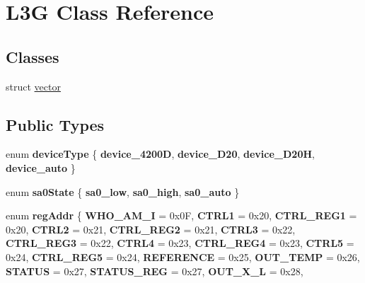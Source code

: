 \hypertarget{class_l3_g}{}\section{L3G Class Reference}
\label{class_l3_g}
\subsection*{Classes}
\begin{DoxyCompactItemize}
\item 
struct \hyperlink{struct_l3_g_1_1vector}{vector}
\end{DoxyCompactItemize}
\subsection*{Public Types}
\begin{DoxyCompactItemize}
\item 
\mbox{\label{class_l3_g_a1bdc3c228ca5694828d9c174d52d9699}} 
enum {\bfseries device\+Type} \{ {\bfseries device\+\_\+4200D}, 
{\bfseries device\+\_\+\+D20}, 
{\bfseries device\+\_\+\+D20H}, 
{\bfseries device\+\_\+auto}
 \}
\item 
\mbox{\label{class_l3_g_a2f29221d97b804da8028bfeed6522b9a}} 
enum {\bfseries sa0\+State} \{ {\bfseries sa0\+\_\+low}, 
{\bfseries sa0\+\_\+high}, 
{\bfseries sa0\+\_\+auto}
 \}
\item 
\mbox{\label{class_l3_g_a3f96d1f7eac3f8b8b645464390c79319}} 
enum {\bfseries reg\+Addr} \{ \newline
{\bfseries W\+H\+O\+\_\+\+A\+M\+\_\+I} = 0x0F, 
{\bfseries C\+T\+R\+L1} = 0x20, 
{\bfseries C\+T\+R\+L\+\_\+\+R\+E\+G1} = 0x20, 
{\bfseries C\+T\+R\+L2} = 0x21, 
\newline
{\bfseries C\+T\+R\+L\+\_\+\+R\+E\+G2} = 0x21, 
{\bfseries C\+T\+R\+L3} = 0x22, 
{\bfseries C\+T\+R\+L\+\_\+\+R\+E\+G3} = 0x22, 
{\bfseries C\+T\+R\+L4} = 0x23, 
\newline
{\bfseries C\+T\+R\+L\+\_\+\+R\+E\+G4} = 0x23, 
{\bfseries C\+T\+R\+L5} = 0x24, 
{\bfseries C\+T\+R\+L\+\_\+\+R\+E\+G5} = 0x24, 
{\bfseries R\+E\+F\+E\+R\+E\+N\+CE} = 0x25, 
\newline
{\bfseries O\+U\+T\+\_\+\+T\+E\+MP} = 0x26, 
{\bfseries S\+T\+A\+T\+US} = 0x27, 
{\bfseries S\+T\+A\+T\+U\+S\+\_\+\+R\+EG} = 0x27, 
{\bfseries O\+U\+T\+\_\+\+X\+\_\+L} = 0x28, 
\newline

\end{DoxyCompactItemize}
